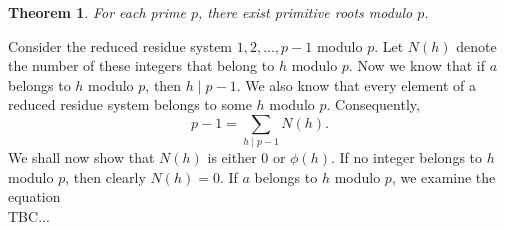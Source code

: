 \documentclass{article}
\makeatletter
\newtheorem{theorem}{Theorem}[section]
\theoremstyle{definition}
\theoremstyle{remark}
\let\oldproofname=\proofname
\renewcommand{\proofname}{\textit{\oldproofname}}
\theoremstyle{definition}
\renewenvironment{proof}[1][\proofname]{\par
  \pushQED{\qed}%
  \normalfont \topsep6\p@\@plus6\p@\relax
  \list{}{\leftmargin=0mm
          \rightmargin=0mm
          \settowidth{\itemindent}{\itshape#1}%
          \labelwidth=\itemindent
          \parsep=0pt \listparindent=0mm%
  }
  \item[\hskip\labelsep
        \itshape
    #1\@addpunct{.}]\ignorespaces
}{%
  \popQED\endlist\@endpefalse
}
\makeatother
\begin{document}
    \begin{theorem}\label{thm:2.6}
        For each prime $p$, there exist primitive roots modulo $p$.
    \end{theorem}
        \begin{proof}
            Consider the reduced residue system $1,2,\dots,p-1$ modulo $p$. Let $N(h)$ denote the number of these integers that belong to $h$ modulo $p$. Now we know that if $a$ belongs to $h$ modulo $p$, then $h\mid p-1$. We also know that every element of a reduced residue system belongs to some $h$ modulo $p$. Consequently,
                \begin{equation*}
                    p-1=\sum_{h\mid p-1}N(h).
                \end{equation*}
            We shall now show that $N(h)$ is either 0 or $\phi(h)$. If no integer belongs to $h$ modulo $p$, then clearly $N(h)=0$. If $a$ belongs to $h$ modulo $p$, we examine the equation
                \begin{equation*}
                    
                \end{equation*}
            TBC...
        \end{proof}
\end{document}
